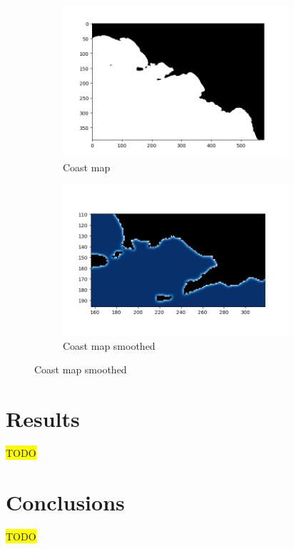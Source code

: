 \documentclass[journal,article,submit,pdftex,moreauthors]{Definitions/mdpi}
\begin{document}
\begin{figure}[h]
	\begin{subfigure}{0.5\textwidth}
		\centering
		\includegraphics[width=\textwidth]{res/imgs/coast.png}
		\caption{Coast map}
		\label{fig:coast}
	\end{subfigure}
	\begin{subfigure}{0.5\textwidth}
		\centering
		\includegraphics[width=\textwidth]{res/imgs/coastBlur.png}
		\caption{Coast map smoothed}
		\label{fig:coastBlur}
	\end{subfigure}
\end{figure}


\section{Results}
\colorbox{yellow}{TODO}

\section{Conclusions}
\colorbox{yellow}{TODO}
\end{document}
